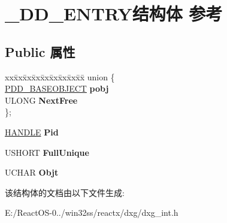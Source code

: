 \hypertarget{struct___d_d___e_n_t_r_y}{}\section{\+\_\+\+D\+D\+\_\+\+E\+N\+T\+R\+Y结构体 参考}
\label{struct___d_d___e_n_t_r_y}
\subsection*{Public 属性}
\begin{DoxyCompactItemize}
\item 
\mbox{\label{struct___d_d___e_n_t_r_y_a00d7991b2e24ccba3346a53dfca74d23}} 
\begin{tabbing}
xx\=xx\=xx\=xx\=xx\=xx\=xx\=xx\=xx\=\kill
union \{\\
\>\hyperlink{struct___d_d___b_a_s_e_o_b_j_e_c_t}{PDD\_BASEOBJECT} {\bfseries pobj}\\
\>ULONG {\bfseries NextFree}\\
\}; \\

\end{tabbing}\item 
\mbox{\label{struct___d_d___e_n_t_r_y_af50b57652a7836ee12418232d875022e}} 
\hyperlink{interfacevoid}{H\+A\+N\+D\+LE} {\bfseries Pid}
\item 
\mbox{\label{struct___d_d___e_n_t_r_y_a653484b512503570b2864d8248fcb15d}} 
U\+S\+H\+O\+RT {\bfseries Full\+Unique}
\item 
\mbox{\label{struct___d_d___e_n_t_r_y_a9f14ad695ea005dcb6a0d935e4bf2c84}} 
U\+C\+H\+AR {\bfseries Objt}
\end{DoxyCompactItemize}


该结构体的文档由以下文件生成\+:\begin{DoxyCompactItemize}
\item 
E\+:/\+React\+O\+S-\/0../win32ss/reactx/dxg/dxg\+\_\+int.\+h\end{DoxyCompactItemize}
